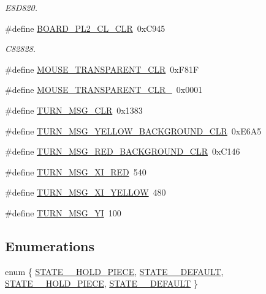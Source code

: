 \begin{DoxyCompactItemize}
\begin{DoxyCompactList}\small\item\em E8\+D820. \end{DoxyCompactList}\item 
\#define \hyperlink{group___checkers_gaf7041b1453aa70a12d1dac1602d93ca8}{B\+O\+A\+R\+D\+\_\+\+P\+L2\+\_\+\+C\+L\+\_\+\+C\+LR}~0x\+C945
\begin{DoxyCompactList}\small\item\em C82828. \end{DoxyCompactList}\item 
\#define \hyperlink{group___checkers_gaab1a3cc5eb6c2a45aca8a4d8a5e08707}{M\+O\+U\+S\+E\+\_\+\+T\+R\+A\+N\+S\+P\+A\+R\+E\+N\+T\+\_\+\+C\+LR}~0x\+F81F
\item 
\#define \hyperlink{group___checkers_gaa2ef662fb61ca6849a43030a495c4afa}{M\+O\+U\+S\+E\+\_\+\+T\+R\+A\+N\+S\+P\+A\+R\+E\+N\+T\+\_\+\+C\+L\+R\+\_}~0x0001
\item 
\#define \hyperlink{group___checkers_gac55bb8c3d7fd471107553465b14fae49}{T\+U\+R\+N\+\_\+\+M\+S\+G\+\_\+\+C\+LR}~0x1383
\item 
\#define \hyperlink{group___checkers_ga6d237f394788ef28deeaf21d0a6637f2}{T\+U\+R\+N\+\_\+\+M\+S\+G\+\_\+\+Y\+E\+L\+L\+O\+W\+\_\+\+B\+A\+C\+K\+G\+R\+O\+U\+N\+D\+\_\+\+C\+LR}~0x\+E6\+A5
\item 
\#define \hyperlink{group___checkers_ga98c171a878c38e1c25fb081562041c44}{T\+U\+R\+N\+\_\+\+M\+S\+G\+\_\+\+R\+E\+D\+\_\+\+B\+A\+C\+K\+G\+R\+O\+U\+N\+D\+\_\+\+C\+LR}~0x\+C146
\item 
\#define \hyperlink{group___checkers_gaf92e8ff13dda8277eaf67d6a59863510}{T\+U\+R\+N\+\_\+\+M\+S\+G\+\_\+\+X\+I\+\_\+\+R\+ED}~540
\item 
\#define \hyperlink{group___checkers_gae8d1a563a8d7003deca2e08f762ae9f7}{T\+U\+R\+N\+\_\+\+M\+S\+G\+\_\+\+X\+I\+\_\+\+Y\+E\+L\+L\+OW}~480
\item 
\#define \hyperlink{group___checkers_gad96cfcfb473995338b12290370836079}{T\+U\+R\+N\+\_\+\+M\+S\+G\+\_\+\+YI}~100
\end{DoxyCompactItemize}
\subsection*{Enumerations}
\begin{DoxyCompactItemize}
\item 
enum \{ \hyperlink{group___checkers_gga06fc87d81c62e9abb8790b6e5713c55bacad03968ad3abc8b7121ad472826aca9}{S\+T\+A\+T\+E\+\_\+\_\+\+H\+O\+L\+D\+\_\+\+P\+I\+E\+CE}, 
\hyperlink{group___checkers_gga06fc87d81c62e9abb8790b6e5713c55bad88d91bd9763e878df21645bae0ba9b5}{S\+T\+A\+T\+E\+\_\+\_\+\+D\+E\+F\+A\+U\+LT}, 
\hyperlink{group___checkers_gga06fc87d81c62e9abb8790b6e5713c55ba946a863b3f5d8ac63feb55f4e0866597}{S\+T\+A\+T\+E\+\_\+\_\+\+H\+O\+L\+D\+\_\+\+P\+I\+E\+CE}, 
\hyperlink{group___checkers_gga06fc87d81c62e9abb8790b6e5713c55ba156b7cbfed5b8a1ad54b568ebc257ae9}{S\+T\+A\+T\+E\+\_\+\_\+\+D\+E\+F\+A\+U\+LT}
 \}
\end{DoxyCompactItemize}
